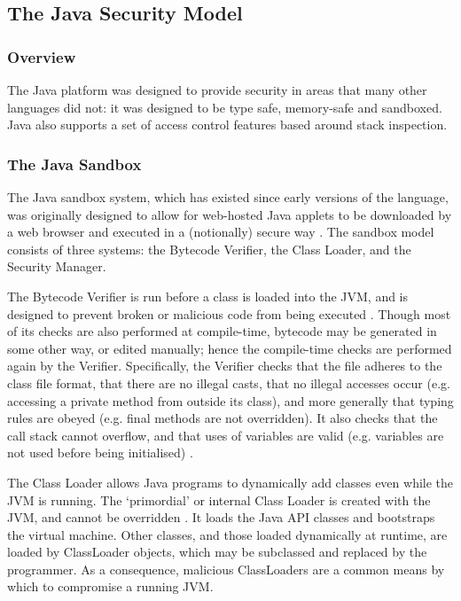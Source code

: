 \subsection{The Java Security Model}

\subsubsection{Overview}

The Java platform was designed to provide security in areas that many other languages did not: it was designed to be type safe, memory-safe and sandboxed. Java also supports a set of access control features based around stack inspection.

\subsubsection{The Java Sandbox}

The Java sandbox system, which has existed since early versions of the language, was originally designed to allow for web-hosted Java applets to be downloaded by a web browser and executed in a (notionally) secure way \cite{mcgraw1999securingjava}. The sandbox model consists of three systems: the Bytecode Verifier, the Class Loader, and the Security Manager.

The Bytecode Verifier is run before a class is loaded into the JVM, and is designed to prevent broken or malicious code from being executed \cite{mcgraw1999securingjava}. Though most of its checks are also performed at compile-time, bytecode may be generated in some other way, or edited manually; hence the compile-time checks are performed again by the Verifier. Specifically, the Verifier checks that the file adheres to the class file format, that there are no illegal casts, that no illegal accesses occur (e.g. accessing a private method from outside its class), and more generally that typing rules are obeyed (e.g. final methods are not overridden). It also checks that the call stack cannot overflow, and that uses of variables are valid (e.g. variables are not used before being initialised) \cite{lindholm2014java}.

The Class Loader allows Java programs to dynamically add classes even while the JVM is running. The `primordial' or internal Class Loader is created with the JVM, and cannot be overridden \cite{mcgraw1999securingjava}. It loads the Java API classes and bootstraps the virtual machine. Other classes, and those loaded dynamically at runtime, are loaded by ClassLoader objects, which may be subclassed and replaced by the programmer. As a consequence, malicious ClassLoaders are a common means by which to compromise a running JVM.

